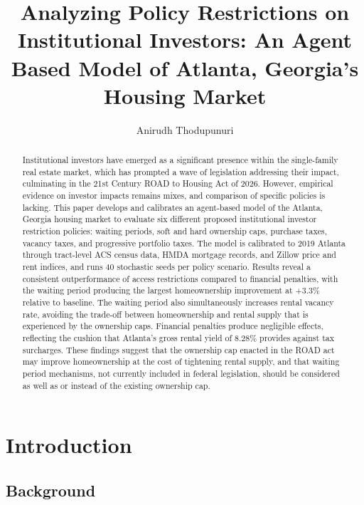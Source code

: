 \documentclass[twocolumn,showpacs,%
  nofootinbib,aps,superscriptaddress,%
  eqsecnum,prd,notitlepage,showkeys,10pt]{revtex4-1}
\begin{document}
\title{Analyzing Policy Restrictions on Institutional Investors: An Agent Based Model of Atlanta, Georgia's Housing Market}
\author{Anirudh Thodupunuri}

\begin{abstract}

Institutional investors have emerged as a significant presence within the single-family real estate market, which has prompted a wave of legislation addressing their impact, culminating in the 21st Century ROAD to Housing Act of 2026. However, empirical evidence on investor impacts remains mixes, and comparison of specific policies is lacking. This paper develops and calibrates an agent-based model of the Atlanta, Georgia housing market to evaluate six different proposed institutional investor restriction policies: waiting periods, soft and hard ownership caps, purchase taxes, vacancy taxes, and progressive portfolio taxes. The model is calibrated to 2019 Atlanta through tract-level ACS census data, HMDA mortgage records, and Zillow price and rent indices, and runs 40 stochastic seeds per policy scenario. Results reveal a consistent outperformance of access restrictions compared to financial penalties, with the waiting period producing the largest homeownership improvement at $+3.3\%$ relative to baseline. The waiting period also simultaneously increases rental vacancy rate, avoiding the trade-off between homeownership and rental supply that is experienced by the ownership caps. Financial penalties produce negligible effects, reflecting the cushion that Atlanta's gross rental yield of $8.28\%$ provides against tax surcharges. These findings suggest that the ownership cap enacted in the ROAD act may improve homeownership at the cost of tightening rental supply, and that waiting period mechanisms, not currently included in federal legislation, should be considered as well as or instead of the existing ownership cap. 


\end{abstract}

\maketitle

\section{Introduction}

\subsection{Background}
\end{document}
